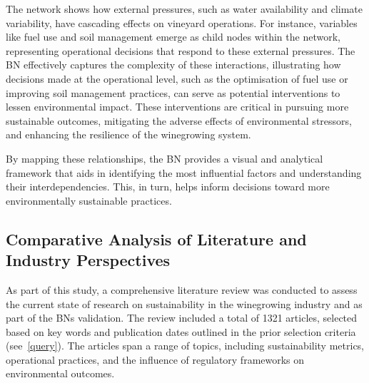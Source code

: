 \documentclass[fleqn,10pt]{wlscirep}
\begin{document}
The network shows how external pressures, such as water availability and climate variability, have cascading effects on vineyard operations. For instance, variables like fuel use and soil management emerge as child nodes within the network, representing operational decisions that respond to these external pressures. The BN effectively captures the complexity of these interactions, illustrating how decisions made at the operational level, such as the optimisation of fuel use or improving soil management practices, can serve as potential interventions to lessen environmental impact. These interventions are critical in pursuing more sustainable outcomes, mitigating the adverse effects of environmental stressors, and enhancing the resilience of the winegrowing system.

By mapping these relationships, the BN provides a visual and analytical framework that aids in identifying the most influential factors and understanding their interdependencies. This, in turn, helps inform decisions toward more environmentally sustainable practices.

\subsection*{Comparative Analysis of Literature and Industry Perspectives}

As part of this study, a comprehensive literature review was conducted to assess the current state of research on sustainability in the winegrowing industry and as part of the BNs validation. The review included a total of 1321 articles, selected based on key words and publication dates outlined in the prior selection criteria (see~\ref{query}). The articles span a range of topics, including sustainability metrics, operational practices, and the influence of regulatory frameworks on environmental outcomes.
\end{document}
